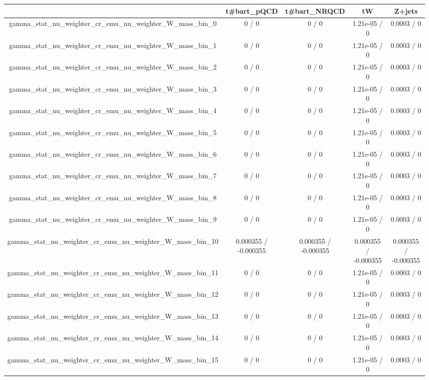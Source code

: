 \documentclass[10pt]{article}
\begin{document}
\begin{table}[htbp]
\begin{center}
\begin{tabular}{|c|c|c|c|c|}
\hline 
      & t#bar{t}_{pQCD}      & t#bar{t}_{NRQCD}      & tW      & Z+jets \\ 
\hline 
  gamma_stat_nu_weighter_cr_emu_nu_weighter_W_mass_bin_0 & 0 / 0 & 0 / 0 & 1.21e-05 / 0 & 0.0003 / 0 \\ 
  gamma_stat_nu_weighter_cr_emu_nu_weighter_W_mass_bin_1 & 0 / 0 & 0 / 0 & 1.21e-05 / 0 & 0.0003 / 0 \\ 
  gamma_stat_nu_weighter_cr_emu_nu_weighter_W_mass_bin_2 & 0 / 0 & 0 / 0 & 1.21e-05 / 0 & 0.0003 / 0 \\ 
  gamma_stat_nu_weighter_cr_emu_nu_weighter_W_mass_bin_3 & 0 / 0 & 0 / 0 & 1.21e-05 / 0 & 0.0003 / 0 \\ 
  gamma_stat_nu_weighter_cr_emu_nu_weighter_W_mass_bin_4 & 0 / 0 & 0 / 0 & 1.21e-05 / 0 & 0.0003 / 0 \\ 
  gamma_stat_nu_weighter_cr_emu_nu_weighter_W_mass_bin_5 & 0 / 0 & 0 / 0 & 1.21e-05 / 0 & 0.0003 / 0 \\ 
  gamma_stat_nu_weighter_cr_emu_nu_weighter_W_mass_bin_6 & 0 / 0 & 0 / 0 & 1.21e-05 / 0 & 0.0003 / 0 \\ 
  gamma_stat_nu_weighter_cr_emu_nu_weighter_W_mass_bin_7 & 0 / 0 & 0 / 0 & 1.21e-05 / 0 & 0.0003 / 0 \\ 
  gamma_stat_nu_weighter_cr_emu_nu_weighter_W_mass_bin_8 & 0 / 0 & 0 / 0 & 1.21e-05 / 0 & 0.0003 / 0 \\ 
  gamma_stat_nu_weighter_cr_emu_nu_weighter_W_mass_bin_9 & 0 / 0 & 0 / 0 & 1.21e-05 / 0 & 0.0003 / 0 \\ 
  gamma_stat_nu_weighter_cr_emu_nu_weighter_W_mass_bin_10 & 0.000355 / -0.000355 & 0.000355 / -0.000355 & 0.000355 / -0.000355 & 0.000355 / -0.000355 \\ 
  gamma_stat_nu_weighter_cr_emu_nu_weighter_W_mass_bin_11 & 0 / 0 & 0 / 0 & 1.21e-05 / 0 & 0.0003 / 0 \\ 
  gamma_stat_nu_weighter_cr_emu_nu_weighter_W_mass_bin_12 & 0 / 0 & 0 / 0 & 1.21e-05 / 0 & 0.0003 / 0 \\ 
  gamma_stat_nu_weighter_cr_emu_nu_weighter_W_mass_bin_13 & 0 / 0 & 0 / 0 & 1.21e-05 / 0 & 0.0003 / 0 \\ 
  gamma_stat_nu_weighter_cr_emu_nu_weighter_W_mass_bin_14 & 0 / 0 & 0 / 0 & 1.21e-05 / 0 & 0.0003 / 0 \\ 
  gamma_stat_nu_weighter_cr_emu_nu_weighter_W_mass_bin_15 & 0 / 0 & 0 / 0 & 1.21e-05 / 0 & 0.0003 / 0 \\ 

\end{tabular}
\end{center}
\end{table}
\end{document}
